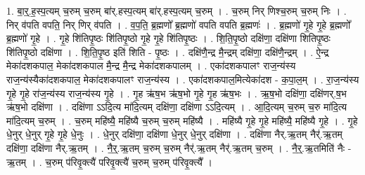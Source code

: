 \documentclass[17pt]{extarticle}
\begin{document}
1. बा॒र्॒.ह॒स्प॒त्यम् च॒रुम् च॒रुम् बा॑र्.हस्प॒त्यम् बा॑र्.हस्प॒त्यम् च॒रुम् । . च॒रुम् निर् णिश्च॒रुम् च॒रुम् निः । . निर् व॑पति वपति॒ निर् णिर् व॑पति । . व॒प॒ति॒ ब्र॒ह्मणो᳚ ब्र॒ह्मणो॑ वपति वपति ब्र॒ह्मणः॑ । . ब्र॒ह्मणो॑ गृ॒हे गृ॒हे ब्र॒ह्मणो᳚ ब्र॒ह्मणो॑ गृ॒हे । . गृ॒हे शि॑तिपृ॒ष्ठः शि॑तिपृ॒ष्ठो गृ॒हे गृ॒हे शि॑तिपृ॒ष्ठः । . शि॒ति॒पृ॒ष्ठो दक्षि॑णा॒ दक्षि॑णा शितिपृ॒ष्ठः शि॑तिपृ॒ष्ठो दक्षि॑णा । . शि॒ति॒पृ॒ष्ठ इति॑ शिति - पृ॒ष्ठः । . दक्षि॑णै॒न्द्र मै॒न्द्रम् दक्षि॑णा॒ दक्षि॑णै॒न्द्रम् । . ऐ॒न्द्र मेका॑दशकपाल॒ मेका॑दशकपाल मै॒न्द्र मै॒न्द्र मेका॑दशकपालम् । . एका॑दशकपालꣳ राज॒न्य॑स्य राज॒न्य॑स्यैका॑दशकपाल॒ मेका॑दशकपालꣳ राज॒न्य॑स्य । . एका॑दशकपाल॒मित्येका॑दश - क॒पा॒ल॒म् । . रा॒ज॒न्य॑स्य गृ॒हे गृ॒हे रा॑ज॒न्य॑स्य राज॒न्य॑स्य गृ॒हे । . गृ॒ह ऋ॑ष॒भ ऋ॑ष॒भो गृ॒हे गृ॒ह ऋ॑ष॒भः । . ऋ॒ष॒भो दक्षि॑णा॒ दक्षि॑णर्.ष॒भ ऋ॑ष॒भो दक्षि॑णा । . दक्षि॑णा ऽऽदि॒त्य मा॑दि॒त्यम् दक्षि॑णा॒ दक्षि॑णा ऽऽदि॒त्यम् । . आ॒दि॒त्यम् च॒रुम् च॒रु मा॑दि॒त्य मा॑दि॒त्यम् च॒रुम् । . च॒रुम् महि॑ष्यै॒ महि॑ष्यै च॒रुम् च॒रुम् महि॑ष्यै । . महि॑ष्यै गृ॒हे गृ॒हे महि॑ष्यै॒ महि॑ष्यै गृ॒हे । . गृ॒हे धे॒नुर् धे॒नुर् गृ॒हे गृ॒हे धे॒नुः । . धे॒नुर् दक्षि॑णा॒ दक्षि॑णा धे॒नुर् धे॒नुर् दक्षि॑णा । . दक्षि॑णा नैर्.ऋ॒तम् नैर्॑.ऋ॒तम् दक्षि॑णा॒ दक्षि॑णा नैर्.ऋ॒तम् । . नै॒र्॒.ऋ॒तम् च॒रुम् च॒रुम् नैर्॑.ऋ॒तम् नैर्॑.ऋ॒तम् च॒रुम् । . नै॒र्॒.ऋ॒तमिति॑ नैः - ऋ॒तम् । . च॒रुम् प॑रिवृ॒क्त्यै॑ परिवृ॒क्त्यै॑ च॒रुम् च॒रुम् प॑रिवृ॒क्त्यै᳚ । \newline
\end{document}

